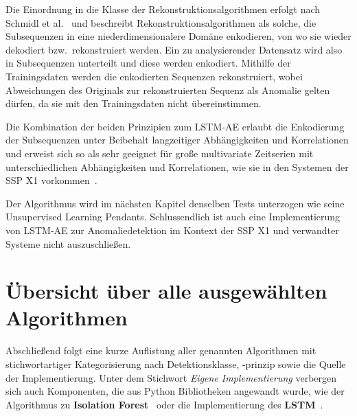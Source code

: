 Die Einordnung in die Klasse der Rekonstruktionsalgorithmen erfolgt nach Schmidl et al.~\cite{Schmidl2022} und beschreibt Rekonstruktionsalgorithmen
als solche, die Subsequenzen in eine niederdimensionalere Do\-mäne enkodieren, von wo sie wieder dekodiert bzw.~rekonstruiert werden. Ein zu analysierender
Datensatz wird also in Subsequenzen unterteilt und diese werden enkodiert. Mithilfe der Trainingsdaten werden die enkodierten Sequenzen rekonstruiert,
wobei Abweichungen des Originals zur rekonstruierten Sequenz als Anomalie gelten dürfen, da sie mit den Trainingsdaten nicht übereinstimmen.

Die Kombination der beiden Prinzipien zum LSTM-AE erlaubt die Enkodierung der Subsequenzen unter Beibehalt langzeitiger Abhängigkeiten und Korrelationen
und erweist sich so als sehr geeignet für große multivariate Zeitserien mit unterschiedlichen Abhängigkeiten und Korrelationen, wie sie in den Systemen
der SSP X1 vorkommen~\cite{Wei2022}.

Der Algorithmus wird im nächsten Kapitel denselben Tests unterzogen wie seine Unsupervised Learning Pendants. Schlussendlich ist auch eine
Implementierung von LSTM-AE zur Anomaliedetektion im Kontext der SSP X1 und verwandter Systeme nicht auszuschließen.

\section{Übersicht über alle ausgewählten Algorithmen}

Abschließend folgt eine kurze Auflistung aller genannten Algorithmen mit stichwortartiger Kategorisierung nach Detektionsklasse, -prinzip sowie die Quelle der
Implementierung. Unter dem Stichwort \textit{Eigene Implementierung} verbergen sich auch Komponenten, die aus Python Bibliotheken angewandt wurde, wie der
Algorithmus zu \textbf{Isolation Forest}~\cite{scikit-learn} oder die Implementierung des \textbf{LSTM}~\cite{pytorch}.

